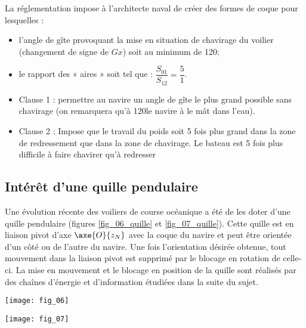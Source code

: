 La réglementation impose à l’architecte naval de créer des formes de coque pour lesquelles :
\begin{itemize}
\item l’angle de gîte provoquant la mise en situation de chavirage du voilier (changement de signe de $Gx$) soit au minimum de 120\degres;
\item le rapport des « aires » soit tel que : $\dfrac{S_{01}}{S_{12}}=\dfrac{5}{1}$.
\end{itemize}
\fi

\ifprof
\begin{corrige}
\begin{itemize}
\item Clause 1 : permettre au navire un angle de gîte le plus grand possible sans chavirage (on remarquera qu’à 120\degres le navire à le mât dans l’eau).
\item Clause 2 : Impose que le travail du poids soit 5 fois plus grand dans la zone de redressement que dans la zone de chavirage. Le bateau est 5 fois plus difficile à faire chavirer qu’à redresser
\end{itemize}
\end{corrige}
\else
\fi



\subsection{Intérêt d’une quille pendulaire}
\ifprof
\else
Une évolution récente des voiliers de course océanique a été de les doter d’une quille pendulaire (figures \ref{fig_06_quille} et \ref{fig_07_quille}). Cette quille est en liaison pivot d’axe $\axe{O}{z_N}$ avec la coque du navire et peut être orientée d’un côté ou de l’autre du navire. Une fois l’orientation désirée obtenue, tout mouvement dans la liaison pivot est supprimé par le blocage en rotation de celle-ci. La mise en mouvement et le blocage en position de la quille sont réalisés par des chaînes d’énergie et d’information étudiées dans la suite du sujet. 

\begin{minipage}[b]{.47\linewidth}
\begin{center}
\texttt{[image: fig\_06]}
\end{center}
\end{minipage}\hfill
\begin{minipage}[b]{.47\linewidth}
\begin{center}
\texttt{[image: fig\_07]}
\end{center}
 \end{minipage}



